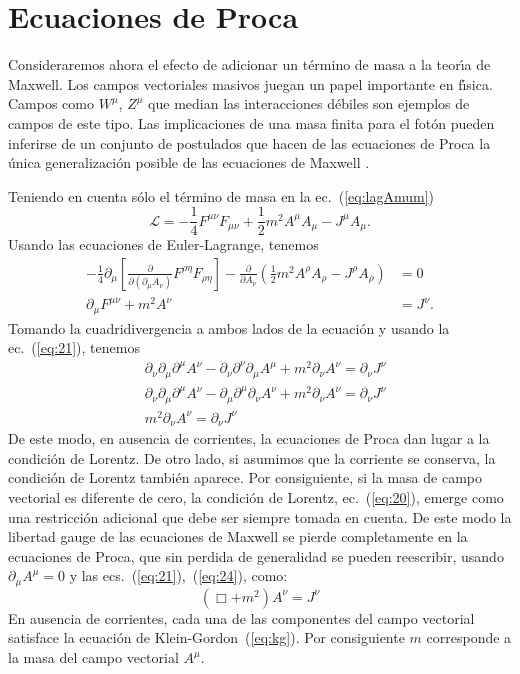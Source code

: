 \section{Ecuaciones de Proca}
\label{sec:ecuacion-de-proca}
\begin{frame}


Consideraremos ahora el efecto de adicionar un t\'ermino de masa a la teor\'\i a de
Maxwell. Los campos vectoriales masivos juegan un papel importante en
f\'\i sica. Campos como $W^\mu$, $Z^\mu$ que median las interacciones d\'ebiles
son ejemplos de campos de este tipo. Las implicaciones de una masa
finita para el fot\'on pueden inferirse de un conjunto de postulados que
hacen de las ecuaciones de Proca la \'unica generalizaci\'on posible de
las ecuaciones de Maxwell \cite{Goldhaber:1971mr}. 

Teniendo en cuenta s\'olo el t\'ermino de masa en la ec.~(\ref{eq:lagAmum})
\begin{equation}
  \label{eq:23}
  \mathcal{L}=-\frac{1}{4}F^{\mu\nu}F_{\mu\nu}+\frac{1}{2}m^2A^\mu A_\mu-J^\mu A_\mu.
\end{equation}
Usando las ecuaciones de Euler-Lagrange, tenemos
\begin{align}
-\frac{1}{4}\partial_\mu
  \left[
\frac{\partial}{\partial(\partial_\mu A_\nu)}F^{\rho\eta}F_{\rho\eta}
  \right]-
\frac{\partial}{\partial A_\nu}
\left(
\frac{1}{2}m^2A^\rho A_\rho-J^\rho A_\rho
\right)&=0\nonumber\\
\label{eq:24}
\partial_\mu F^{\mu\nu}+m^2A^\nu&=J^\nu.
\end{align}
Tomando la cuadridivergencia a ambos lados de la ecuaci\'on y usando la
ec.~(\ref{eq:21}), tenemos
\begin{align}
 &\partial_\nu\partial_\mu\partial^\mu A^\nu-\partial_\nu\partial^\nu\partial_\mu A^\mu+m^2\partial_\nu A^\nu=\partial_\nu J^\nu\nonumber\\
 &\partial_\nu\partial_\mu\partial^\mu A^\nu-\partial_\mu\partial^\mu\partial_\nu A^\nu+m^2\partial_\nu A^\nu=\partial_\nu J^\nu\nonumber\\
\label{eq:25}
 &m^2\partial_\nu A^\nu=\partial_\nu J^\nu
\end{align}
De este modo, en ausencia de corrientes, la ecuaciones de Proca dan
lugar a la condici\'on de Lorentz. De otro lado, si asumimos que la
corriente se conserva, la condici\'on de Lorentz tambi\'en aparece. Por
consiguiente, si la masa de campo vectorial es diferente de cero, la
condici\'on de Lorentz, ec.~(\ref{eq:20}), emerge como una restricci\'on
adicional que debe ser siempre tomada en cuenta. De este modo la
libertad gauge de las ecuaciones de Maxwell se pierde completamente en
la ecuaciones de Proca, que sin perdida de generalidad se pueden
reescribir, usando $\partial_\mu A^\mu=0$ y las ecs.~(\ref{eq:21}),~(\ref{eq:24}),  como:
\begin{equation}
  \label{eq:26}
   (\Box+m^2)A^\nu=J^\nu
\end{equation}
En ausencia de corrientes, cada una de las componentes del campo
vectorial satisface la ecuaci\'on de Klein-Gordon~(\ref{eq:kg}). Por
consiguiente $m$ corresponde a la masa del campo vectorial
$A^\mu$. 


\end{frame}
